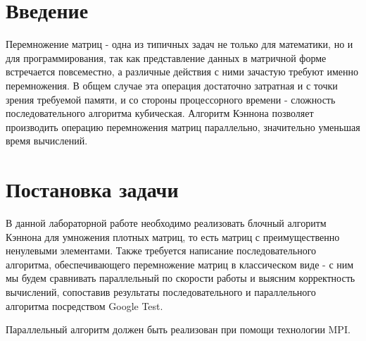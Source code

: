 \documentclass{report}
\begin{document}
\setcounter{page}{2}

\tableofcontents
\newpage

\section*{Введение}
\par Перемножение матриц - одна из типичных задач не только для математики, но и для программирования, так как представление данных в матричной форме встречается повсеместно, а различные действия с ними зачастую требуют именно перемножения. В общем случае эта операция достаточно затратная и с точки зрения требуемой памяти, и со стороны процессорного времени - сложность последовательного алгоритма кубическая. Алгоритм Кэннона позволяет производить операцию перемножения матриц параллельно, значительно уменьшая время вычислений. 
\newpage

\section*{Постановка задачи}
\par В данной лабораторной работе необходимо реализовать блочный алгоритм Кэннона для умножения плотных матриц, то есть матриц с преимущественно ненулевыми элементами. Также требуется написание последовательного алгоритма, обеспечивающего перемножение матриц в классическом виде - с ним мы будем сравнивать параллельный по скорости работы и выясним корректность вычислений, сопоставив результаты последовательного и параллельного алгоритма посредством Google Test.
\par Параллельный алгоритм должен быть реализован при помощи технологии MPI.
\newpage

\end{document}
